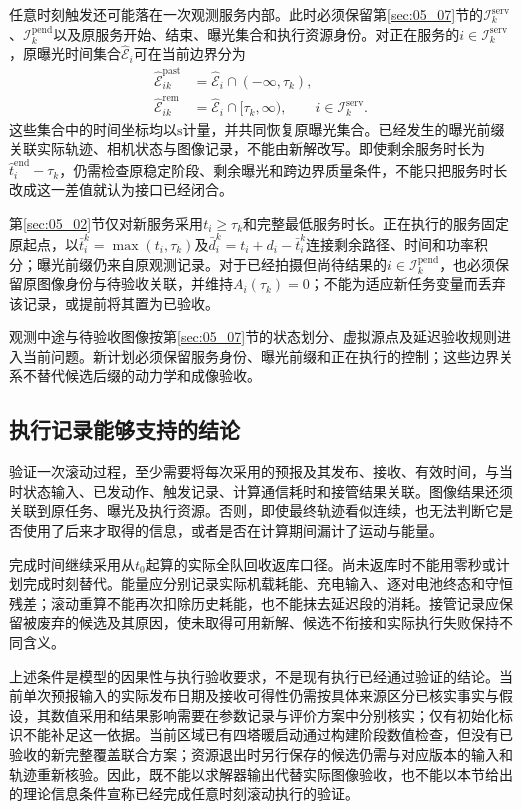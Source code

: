 任意时刻触发还可能落在一次观测服务内部。此时必须保留第\ref{sec:05_07}节的$\mathcal I_k^{\mathrm{serv}}$、$\mathcal I_k^{\mathrm{pend}}$以及原服务开始、结束、曝光集合和执行资源身份。对正在服务的$i\in\mathcal I_k^{\mathrm{serv}}$，原曝光时间集合$\widehat{\mathcal E}_i$可在当前边界分为
\begin{align}
 \widehat{\mathcal E}_{ik}^{\mathrm{past}}
 &=\widehat{\mathcal E}_i\cap(-\infty,\tau_k),
 \label{s0509:exposure_prefix}\\
 \widehat{\mathcal E}_{ik}^{\mathrm{rem}}
 &=\widehat{\mathcal E}_i\cap[\tau_k,\infty),
 \qquad i\in\mathcal I_k^{\mathrm{serv}}.
 \label{s0509:exposure_remainder}
\end{align}
这些集合中的时间坐标均以$\mathrm s$计量，并共同恢复原曝光集合。已经发生的曝光前缀关联实际轨迹、相机状态与图像记录，不能由新解改写。即使剩余服务时长为$\widehat t_i^{\mathrm{end}}-\tau_k$，仍需检查原稳定阶段、剩余曝光和跨边界质量条件，不能只把服务时长改成这一差值就认为接口已经闭合。

第\ref{sec:05_02}节仅对新服务采用$t_i\ge\tau_k$和完整最低服务时长。正在执行的服务固定原起点，以$\bar t_i^k=\max(t_i,\tau_k)$及$\bar d_i^k=t_i+d_i-\bar t_i^k$连接剩余路径、时间和功率积分；曝光前缀仍来自原观测记录。对于已经拍摄但尚待结果的$i\in\mathcal I_k^{\mathrm{pend}}$，也必须保留原图像身份与待验收关联，并维持$A_i(\tau_k)=0$；不能为适应新任务变量而丢弃该记录，或提前将其置为已验收。

观测中途与待验收图像按第\ref{sec:05_07}节的状态划分、虚拟源点及延迟验收规则进入当前问题。新计划必须保留服务身份、曝光前缀和正在执行的控制；这些边界关系不替代候选后缀的动力学和成像验收。

\subsection{执行记录能够支持的结论}

验证一次滚动过程，至少需要将每次采用的预报及其发布、接收、有效时间，与当时状态输入、已发动作、触发记录、计算通信耗时和接管结果关联。图像结果还须关联到原任务、曝光及执行资源。否则，即使最终轨迹看似连续，也无法判断它是否使用了后来才取得的信息，或者是否在计算期间漏计了运动与能量。

完成时间继续采用从$t_0$起算的实际全队回收返库口径。尚未返库时不能用零秒或计划完成时刻替代。能量应分别记录实际机载耗能、充电输入、逐对电池终态和守恒残差；滚动重算不能再次扣除历史耗能，也不能抹去延迟段的消耗。接管记录应保留被废弃的候选及其原因，使未取得可用新解、候选不衔接和实际执行失败保持不同含义。

上述条件是模型的因果性与执行验收要求，不是现有执行已经通过验证的结论。当前单次预报输入的实际发布日期及接收可得性仍需按具体来源区分已核实事实与假设，其数值采用和结果影响需要在参数记录与评价方案中分别核实；仅有初始化标识不能补足这一依据。当前区域已有四塔暖启动通过构建阶段数值检查，但没有已验收的新完整覆盖联合方案；资源退出时另行保存的候选仍需与对应版本的输入和轨迹重新核验。因此，既不能以求解器输出代替实际图像验收，也不能以本节给出的理论信息条件宣称已经完成任意时刻滚动执行的验证。

